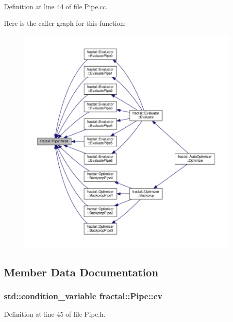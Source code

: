 Definition at line 44 of file Pipe.\+cc.



Here is the caller graph for this function\+:\nopagebreak
\begin{figure}[H]
\begin{center}
\leavevmode
\includegraphics[width=350pt]{db/d22/classfractal_1_1Pipe_affd60158440ecf977873621f7efe769d_icgraph}
\end{center}
\end{figure}




\subsection{Member Data Documentation}
\hypertarget{classfractal_1_1Pipe_af9d5912c0ba763d39ac9b1c03cd54b5e}{
\subsubsection[{cv}]{\setlength{\rightskip}{0pt plus 5cm}std\+::condition\+\_\+variable fractal\+::\+Pipe\+::cv\hspace{0.3cm}{\ttfamily [protected]}}}\label{classfractal_1_1Pipe_af9d5912c0ba763d39ac9b1c03cd54b5e}


Definition at line 45 of file Pipe.\+h.

